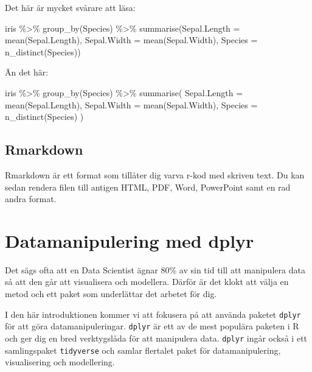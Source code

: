 \documentclass[
]{book}
\newenvironment{Shaded}{\begin{snugshade}}{\end{snugshade}}
\newcommand{\AttributeTok}[1]{\textcolor[rgb]{0.77,0.63,0.00}{#1}}
\newcommand{\FunctionTok}[1]{\textcolor[rgb]{0.00,0.00,0.00}{#1}}
\newcommand{\NormalTok}[1]{#1}
\newcommand{\SpecialCharTok}[1]{\textcolor[rgb]{0.00,0.00,0.00}{#1}}
\begin{document}
Det här är mycket svårare att läsa:

\begin{Shaded}
\begin{Highlighting}[]
\NormalTok{iris }\SpecialCharTok{\%\textgreater{}\%} \FunctionTok{group\_by}\NormalTok{(Species) }\SpecialCharTok{\%\textgreater{}\%} \FunctionTok{summarise}\NormalTok{(}\AttributeTok{Sepal.Length =} \FunctionTok{mean}\NormalTok{(Sepal.Length), }\AttributeTok{Sepal.Width =} \FunctionTok{mean}\NormalTok{(Sepal.Width), }\AttributeTok{Species =} \FunctionTok{n\_distinct}\NormalTok{(Species))}
\end{Highlighting}
\end{Shaded}

Än det här:

\begin{Shaded}
\begin{Highlighting}[]
\NormalTok{iris }\SpecialCharTok{\%\textgreater{}\%}
  \FunctionTok{group\_by}\NormalTok{(Species) }\SpecialCharTok{\%\textgreater{}\%}
  \FunctionTok{summarise}\NormalTok{(}
    \AttributeTok{Sepal.Length =} \FunctionTok{mean}\NormalTok{(Sepal.Length),}
    \AttributeTok{Sepal.Width =} \FunctionTok{mean}\NormalTok{(Sepal.Width),}
    \AttributeTok{Species =} \FunctionTok{n\_distinct}\NormalTok{(Species)}
\NormalTok{  ) }
\end{Highlighting}
\end{Shaded}

\hypertarget{rmarkdown}{%
\section{Rmarkdown}\label{rmarkdown}}

Rmarkdown är ett format som tillåter dig varva r-kod med skriven text. Du kan sedan rendera filen till antigen HTML, PDF, Word, PowerPoint samt en rad andra format.

\hypertarget{databearbetning}{%
\chapter{Datamanipulering med dplyr}\label{databearbetning}}

Det sägs ofta att en Data Scientist ägnar 80\% av sin tid till att manipulera data så att den går att visualisera och modellera. Därför är det klokt att välja en metod och ett paket som underlättar det arbetet för dig.

I den här introduktionen kommer vi att fokusera på att använda paketet \texttt{dplyr} för att göra datamanipuleringar. \texttt{dplyr} är ett av de mest populära paketen i R och ger dig en bred verktygslåda för att manipulera data. \texttt{dplyr} ingår också i ett samlingspaket \texttt{tidyverse} och samlar flertalet paket för datamanipulering, visualisering och modellering.
\end{document}
